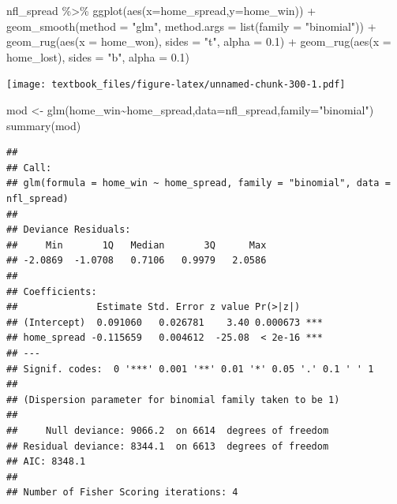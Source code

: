 \documentclass[
  11pt,
]{book}
\newenvironment{Shaded}{\begin{snugshade}}{\end{snugshade}}
\newcommand{\AttributeTok}[1]{\textcolor[rgb]{0.77,0.63,0.00}{#1}}
\newcommand{\FloatTok}[1]{\textcolor[rgb]{0.00,0.00,0.81}{#1}}
\newcommand{\FunctionTok}[1]{\textcolor[rgb]{0.00,0.00,0.00}{#1}}
\newcommand{\NormalTok}[1]{#1}
\newcommand{\OtherTok}[1]{\textcolor[rgb]{0.56,0.35,0.01}{#1}}
\newcommand{\SpecialCharTok}[1]{\textcolor[rgb]{0.00,0.00,0.00}{#1}}
\newcommand{\StringTok}[1]{\textcolor[rgb]{0.31,0.60,0.02}{#1}}
\theoremstyle{definition}
\theoremstyle{definition}
\theoremstyle{definition}
\theoremstyle{definition}
\theoremstyle{remark}
\begin{document}
\newpage

\begin{Shaded}
\begin{Highlighting}[]
\NormalTok{nfl\_spread }\SpecialCharTok{\%\textgreater{}\%} \FunctionTok{ggplot}\NormalTok{(}\FunctionTok{aes}\NormalTok{(}\AttributeTok{x=}\NormalTok{home\_spread,}\AttributeTok{y=}\NormalTok{home\_win)) }\SpecialCharTok{+}
  \FunctionTok{geom\_smooth}\NormalTok{(}\AttributeTok{method =} \StringTok{"glm"}\NormalTok{, }
    \AttributeTok{method.args =} \FunctionTok{list}\NormalTok{(}\AttributeTok{family =} \StringTok{"binomial"}\NormalTok{)) }\SpecialCharTok{+} 
  \FunctionTok{geom\_rug}\NormalTok{(}\FunctionTok{aes}\NormalTok{(}\AttributeTok{x =}\NormalTok{ home\_won), }\AttributeTok{sides =} \StringTok{"t"}\NormalTok{, }\AttributeTok{alpha =} \FloatTok{0.1}\NormalTok{) }\SpecialCharTok{+}
  \FunctionTok{geom\_rug}\NormalTok{(}\FunctionTok{aes}\NormalTok{(}\AttributeTok{x =}\NormalTok{ home\_lost), }\AttributeTok{sides =} \StringTok{"b"}\NormalTok{, }\AttributeTok{alpha =} \FloatTok{0.1}\NormalTok{)}
\end{Highlighting}
\end{Shaded}

\texttt{[image: textbook\_files/figure-latex/unnamed-chunk-300-1.pdf]}

\newpage

\begin{Shaded}
\begin{Highlighting}[]
\NormalTok{mod }\OtherTok{\textless{}{-}} \FunctionTok{glm}\NormalTok{(home\_win}\SpecialCharTok{\textasciitilde{}}\NormalTok{home\_spread,}\AttributeTok{data=}\NormalTok{nfl\_spread,}\AttributeTok{family=}\StringTok{"binomial"}\NormalTok{)}
\FunctionTok{summary}\NormalTok{(mod)}
\end{Highlighting}
\end{Shaded}

\begin{verbatim}
## 
## Call:
## glm(formula = home_win ~ home_spread, family = "binomial", data = nfl_spread)
## 
## Deviance Residuals: 
##     Min       1Q   Median       3Q      Max  
## -2.0869  -1.0708   0.7106   0.9979   2.0586  
## 
## Coefficients:
##              Estimate Std. Error z value Pr(>|z|)    
## (Intercept)  0.091060   0.026781    3.40 0.000673 ***
## home_spread -0.115659   0.004612  -25.08  < 2e-16 ***
## ---
## Signif. codes:  0 '***' 0.001 '**' 0.01 '*' 0.05 '.' 0.1 ' ' 1
## 
## (Dispersion parameter for binomial family taken to be 1)
## 
##     Null deviance: 9066.2  on 6614  degrees of freedom
## Residual deviance: 8344.1  on 6613  degrees of freedom
## AIC: 8348.1
## 
## Number of Fisher Scoring iterations: 4
\end{verbatim}
\end{document}
